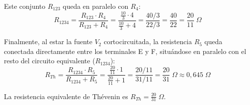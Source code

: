 \documentclass[11pt, a4paper]{article}
\newenvironment{problem}[1][Cuestión]{
		\vspace{0.5cm}
		\noindent{\Large\bfseries #1} \par\vspace{0.5cm}
}{
		\vspace{0.5cm}
}
\begin{document}
\begin{problem}[Problema]
\begin{enumerate}[label=\alph*)]
{					Este conjunto $R_{123}$ queda en paralelo con $R_4$:
					$$R_{1234} = \frac{R_{123} \cdot R_4}{R_{123} + R_4} = \frac{\frac{10}{3} \cdot 4}{\frac{10}{3} + 4} = \frac{40/3}{22/3} = \frac{40}{22} = \frac{20}{11} \;\Omega$$

					Finalmente, al estar la fuente $V_2$ cortocircuitada, la resistencia $R_5$ queda conectada directamente entre los terminales E y F, situándose en paralelo con el resto del circuito equivalente ($R_{1234}$):
					$$R_{Th} = \frac{R_{1234} \cdot R_5}{R_{1234} + R_5} = \frac{\frac{20}{11} \cdot 1}{\frac{20}{11} + 1} = \frac{20/11}{31/11} = \frac{20}{31} \;\Omega \approx 0,645 \;\Omega$$

					La resistencia equivalente de Thévenin es $\boxed{R_{Th} = \frac{20}{31} \;\Omega}$.
				}
		\end{enumerate}
	\end{problem}
\end{document}
